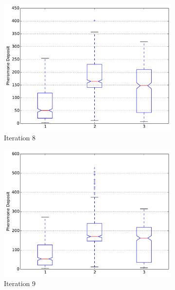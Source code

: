 \documentclass{llncs}
\begin{document}
\begin{figure}[H]
        \begin{subfigure}[b]{0.3\textwidth}
                \includegraphics[width=\textwidth]{PLT/Comparision/BOXPLOT/Iteration8}
                \caption{Iteration 8}
                \label{fig:plt_iter8}
        \end{subfigure}
        \quad
        \begin{subfigure}[b]{0.3\textwidth}
                \includegraphics[width=\textwidth]{PLT/Comparision/BOXPLOT/Iteration9}
                \caption{Iteration 9}
                \label{fig:plt_iter9}
        \end{subfigure}
        \quad
        \begin{subfigure}[b]{0.3\textwidth}

\end{subfigure}
\end{figure}
\end{document}
